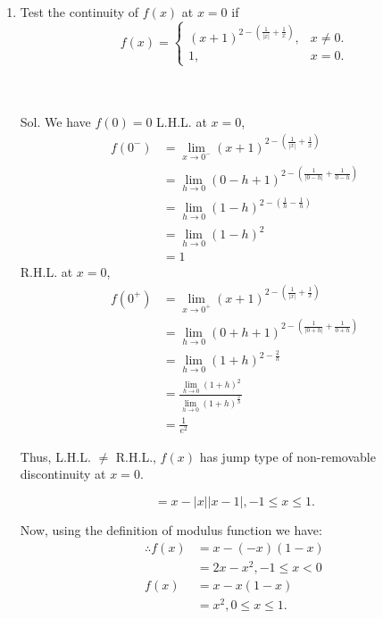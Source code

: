\begin{enumerate}
\item Test the continuity of $f(x)$ at $x=0$ if
$$
f(x)=\left\{\begin{array}{cl}
(x+1)^{2-\left(\frac{1}{|x|}+\frac{1}{x}\right)}, & x \neq 0 . \\
1, & x=0 .
\end{array}\right.
$$\\\\

\begin{outline}
    Sol. We have $f(0)=0$
L.H.L. at $x=0$,
$$
\begin{aligned}
f\left(0^{-}\right) & =\lim _{x \rightarrow 0^{-}}(x+1)^{2-\left(\frac{1}{|x|}+\frac{1}{x}\right)} \\
& =\lim _{h \rightarrow 0}(0-h+1)^{2-\left(\frac{1}{|0-h|}+\frac{1}{0-h}\right)} \\
& =\lim _{h \rightarrow 0}(1-h)^{2-\left(\frac{1}{h}-\frac{1}{h}\right)} \\
& =\lim _{h \rightarrow 0}(1-h)^2 \\
& =1
\end{aligned}
$$
R.H.L. at $x=0$,
$$
\begin{aligned}
f\left(0^{+}\right) & =\lim _{x \rightarrow 0^{+}}(x+1)^{2-\left(\frac{1}{|x|}+\frac{1}{x}\right)} \\
& =\lim _{h \rightarrow 0}(0+h+1)^{2-\left(\frac{1}{|0+h|}+\frac{1}{0+h}\right)} \\
& =\lim _{h \rightarrow 0}(1+h)^{2-\frac{2}{h}} \\
& =\frac{\lim _{h \rightarrow 0}(1+h)^2}{\lim _{h \rightarrow 0}(1+h)^{\frac{2}{h}}} \\
& =\frac{1}{e^2}
\end{aligned}
$$

Thus, L.H.L. $\neq$ R.H.L., $f(x)$ has jump type of non-removable discontinuity at $x=0$.

\end{outline}


$$
=x-|x||x-1|,-1 \leq x \leq 1 .
$$

Now, using the definition of modulus function we have:
$$
\begin{aligned}
\therefore f(x) & =x-(-x)(1-x) \\
& =2 x-x^2,-1 \leq x<0 \\
f(x) & =x-x(1-x) \\
& =x^2, 0 \leq x \leq 1 .
\end{aligned}
$$


\end{enumerate}
